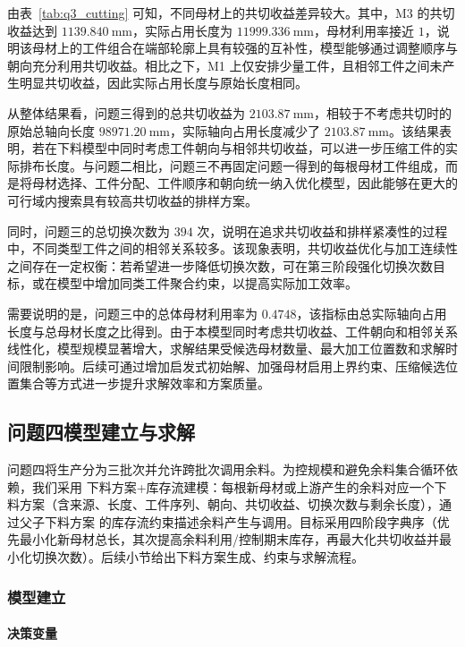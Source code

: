 \documentclass[UTF8]{ctexart}
\begin{document}
由表~\ref{tab:q3_cutting} 可知，不同母材上的共切收益差异较大。其中，M3 的共切收益达到 $1139.840\ \mathrm{mm}$，实际占用长度为 $11999.336\ \mathrm{mm}$，母材利用率接近 $1$，说明该母材上的工件组合在端部轮廓上具有较强的互补性，模型能够通过调整顺序与朝向充分利用共切收益。相比之下，M1 上仅安排少量工件，且相邻工件之间未产生明显共切收益，因此实际占用长度与原始长度相同。

从整体结果看，问题三得到的总共切收益为 $2103.87\ \mathrm{mm}$，相较于不考虑共切时的原始总轴向长度 $98971.20\ \mathrm{mm}$，实际轴向占用长度减少了 $2103.87\ \mathrm{mm}$。该结果表明，若在下料模型中同时考虑工件朝向与相邻共切收益，可以进一步压缩工件的实际排布长度。与问题二相比，问题三不再固定问题一得到的每根母材工件组成，而是将母材选择、工件分配、工件顺序和朝向统一纳入优化模型，因此能够在更大的可行域内搜索具有较高共切收益的排样方案。

同时，问题三的总切换次数为 $394$ 次，说明在追求共切收益和排样紧凑性的过程中，不同类型工件之间的相邻关系较多。该现象表明，共切收益优化与加工连续性之间存在一定权衡：若希望进一步降低切换次数，可在第三阶段强化切换次数目标，或在模型中增加同类工件聚合约束，以提高实际加工效率。

需要说明的是，问题三中的总体母材利用率为 $0.4748$，该指标由总实际轴向占用长度与总母材长度之比得到。由于本模型同时考虑共切收益、工件朝向和相邻关系线性化，模型规模显著增大，求解结果受候选母材数量、最大加工位置数和求解时间限制影响。后续可通过增加启发式初始解、加强母材启用上界约束、压缩候选位置集合等方式进一步提升求解效率和方案质量。

\subsection{问题四模型建立与求解}

问题四将生产分为三批次并允许跨批次调用余料。为控规模和避免余料集合循环依赖，我们采用 下料方案+库存流建模：每根新母材或上游产生的余料对应一个下料方案（含来源、长度、工件序列、朝向、共切收益、切换次数与剩余长度），通过父子下料方案 的库存流约束描述余料产生与调用。目标采用四阶段字典序（优先最小化新母材总长，其次提高余料利用/控制期末库存，再最大化共切收益并最小化切换次数）。后续小节给出下料方案生成、约束与求解流程。

\subsubsection{模型建立}

\paragraph{决策变量}
\end{document}

